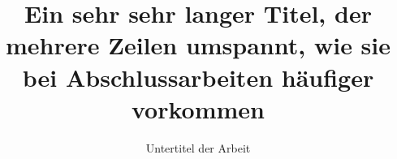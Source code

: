 \documentclass[
english,
]{bama}
\title{Ein sehr sehr langer Titel, der mehrere Zeilen umspannt, wie sie bei Abschlussarbeiten häufiger vorkommen}
\subtitle{Untertitel der Arbeit}
\begin{document}
	\frontmatter
	
	\maketitle

	\declaration

	

	\tableofcontents
	
	\printacronyms

	\mainmatter
	
	

	
	
	
	
	
	
	
	
	
	
	
	

	{\backmatter
	
	\printbibliography
	\listoffigures
	\listoftables

	}
	
	\appendix
	
	
\end{document}
